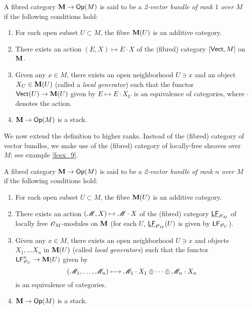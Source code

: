 \begin{defi}
A fibred category ${\bf M}\to \mathsf{Op}(M)$ is said to be a \emph{2-vector bundle of rank $1$ over $M$} if the following conditions hold:
\begin{enumerate}
\item For each open subset $U\subset M$, the fibre ${\bf M}(U)$ is an additive category.
\item There exists an action $(E,X)\mapsto E\cdot X$ of the (fibred) category $[\mathsf{Vect},M]$ on ${\bf M}$.
\item Given any $x\in M$, there exists an open neighborhood $U\ni x$ and an object $X_U\in {\bf M}(U)$ (called a \emph{local generator}) such that the functor $\mathsf{Vect}(U)\to {\bf M}(U)$ given by $E\mapsto E\cdot X_U$ is an equivalence of categories, where $\cdot$ denotes the action.
\item ${\bf M}\to \mathsf{Op}(M)$ is a stack.
\end{enumerate}
\end{defi}

We now extend the definition to higher ranks. Instead of the (fibred) category of vector bundles, we make use of the (fibred) category of locally-free sheaves over $M$; see example \ref{fcex_9}.

\begin{defi}\label{2bundle_n}
A fibred category ${\bf M}\to \mathsf{Op}(M)$ is said to be a \emph{2-vector bundle of rank $n$ over $M$} if the following conditions hold:
\begin{enumerate}
\item For each open subset $U\subset M$, the fibre ${\bf M}(U)$ is an additive category.
\item There exists an action $(\mathscr{M},X)\mapsto \mathscr{M}\cdot X$ of the (fibred) category $\underline{\mathsf{LF}}_{\mathscr{O}_M}$ of locally free $\mathscr{O}_M$-modules on ${\bf M}$ (for each $U$, $\underline{\mathsf{LF}}_{\mathscr{O}_M}(U)$ is given by $\mathsf{LF}_{\mathscr{O}_U}$).
\item Given any $x\in M$, there exists an open neighborhood $U\ni x$ and objects $X_1,\dots X_n$ in ${\bf M}(U)$ (called \emph{local generators}) such that the functor $\mathsf{LF}^n_{\mathscr{O}_U}\to {\bf M}(U)$ given by
$$(\mathscr{M}_1,\dots ,\mathscr{M}_n)\longmapsto \mathscr{M}_1\cdot X_1\oplus \cdots \oplus \mathscr{M}_n\cdot X_n$$
is an equivalence of categories.
\item ${\bf M}\to \mathsf{Op}(M)$ is a stack.
\end{enumerate}
\end{defi}

